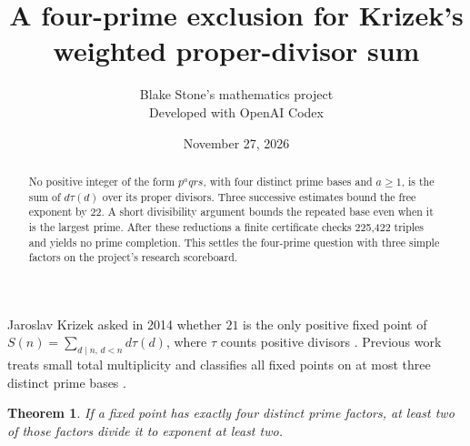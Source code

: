 \documentclass[11pt]{article}
\title{A four-prime exclusion for Krizek's weighted proper-divisor sum}
\author{Blake Stone's mathematics project\\\small Developed with OpenAI Codex}
\date{November 27, 2026}
\newtheorem{theorem}{Theorem}
\begin{document}
\maketitle
\begin{abstract}
No positive integer of the form $p^a qrs$, with four distinct prime bases and $a\ge1$, is the sum of $d\tau(d)$ over its proper divisors. Three successive estimates bound the free exponent by 22. A short divisibility argument bounds the repeated base even when it is the largest prime. After these reductions a finite certificate checks 225,422 triples and yields no prime completion. This settles the four-prime question with three simple factors on the project's research scoreboard.
\end{abstract}
Jaroslav Krizek asked in 2014 whether $21$ is the only positive fixed point of $S(n)=\sum_{d\mid n,\,d<n}d\tau(d)$, where $\tau$ counts positive divisors \cite{oeis}. Previous work treats small total multiplicity \cite{sugui} and classifies all fixed points on at most three distinct prime bases \cite{three}.
\begin{theorem}If a fixed point has exactly four distinct prime factors, at least two of those factors divide it to exponent at least two.\end{theorem}
\end{document}
